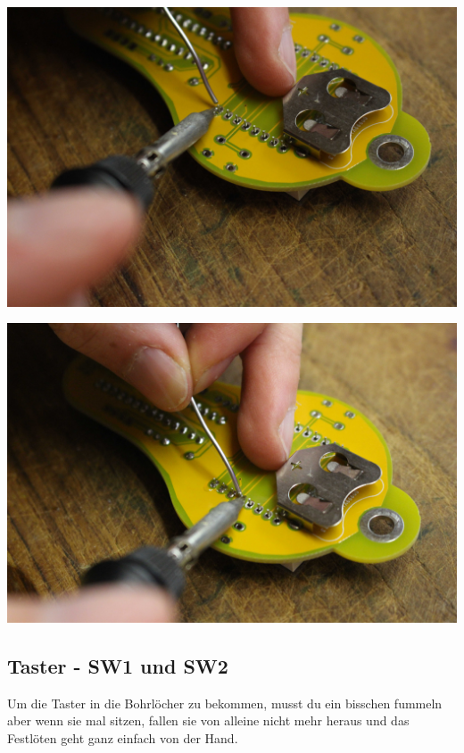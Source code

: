 \documentclass{article}
\begin{document}
\begin{minipage}[b]{0.5\textwidth}
	\includegraphics[width=\textwidth]{Bilder/IMG_5579.JPG}
	\label{fig:}
\end{minipage}
\begin{minipage}[b]{0.5\textwidth}
	\includegraphics[width=\textwidth]{Bilder/IMG_5580.JPG}
	\label{fig:}
\end{minipage}

\subsection{Taster - SW1 und SW2}

Um die Taster in die Bohrlöcher zu bekommen, musst du ein bisschen fummeln aber wenn sie mal sitzen, fallen sie von alleine nicht mehr heraus und das Festlöten geht ganz einfach von der Hand.
\end{document}
